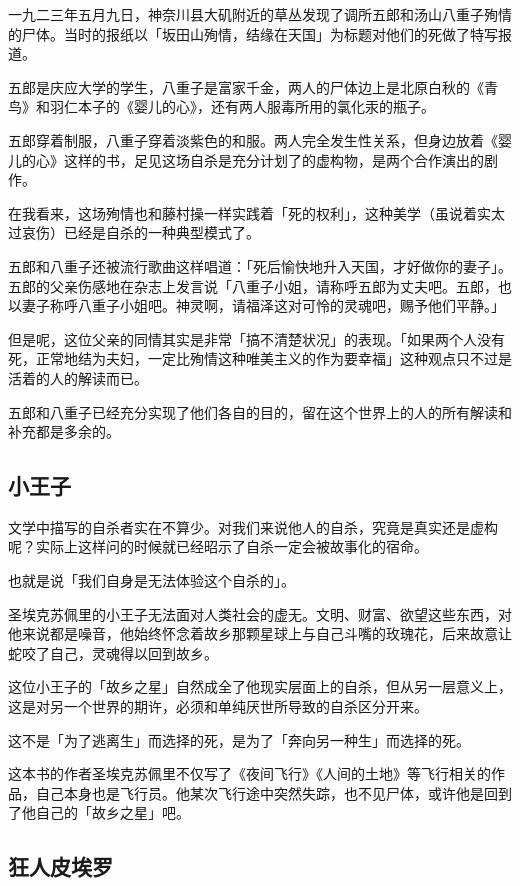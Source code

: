 \documentclass[UTF8]{ctexart}
\begin{document}
一九二三年五月九日，神奈川县大矶附近的草丛发现了调所五郎和汤山八重子殉情的尸体。当时的报纸以「坂田山殉情，结缘在天国」为标题对他们的死做了特写报道。

五郎是庆应大学的学生，八重子是富家千金，两人的尸体边上是北原白秋的《青鸟》和羽仁本子的《婴儿的心》，还有两人服毒所用的氯化汞的瓶子。

五郎穿着制服，八重子穿着淡紫色的和服。两人完全发生性关系，但身边放着《婴儿的心》这样的书，足见这场自杀是充分计划了的虚构物，是两个合作演出的剧作。

在我看来，这场殉情也和藤村操一样实践着「死的权利」，这种美学（虽说着实太过哀伤）已经是自杀的一种典型模式了。

五郎和八重子还被流行歌曲这样唱道：「死后愉快地升入天国，才好做你的妻子」。
五郎的父亲伤感地在杂志上发言说「八重子小姐，请称呼五郎为丈夫吧。五郎，也以妻子称呼八重子小姐吧。神灵啊，请福泽这对可怜的灵魂吧，赐予他们平静。」

但是呢，这位父亲的同情其实是非常「搞不清楚状况」的表现。「如果两个人没有死，正常地结为夫妇，一定比殉情这种唯美主义的作为要幸福」这种观点只不过是活着的人的解读而已。

五郎和八重子已经充分实现了他们各自的目的，留在这个世界上的人的所有解读和补充都是多余的。

\subsection{小王子}
文学中描写的自杀者实在不算少。对我们来说他人的自杀，究竟是真实还是虚构呢？实际上这样问的时候就已经昭示了自杀一定会被故事化的宿命。

也就是说「我们自身是无法体验这个自杀的」。

圣埃克苏佩里的小王子无法面对人类社会的虚无。文明、财富、欲望这些东西，对他来说都是噪音，他始终怀念着故乡那颗星球上与自己斗嘴的玫瑰花，后来故意让蛇咬了自己，灵魂得以回到故乡。

这位小王子的「故乡之星」自然成全了他现实层面上的自杀，但从另一层意义上，这是对另一个世界的期许，必须和单纯厌世所导致的自杀区分开来。

这不是「为了逃离生」而选择的死，是为了「奔向另一种生」而选择的死。

这本书的作者圣埃克苏佩里不仅写了《夜间飞行》《人间的土地》等飞行相关的作品，自己本身也是飞行员。他某次飞行途中突然失踪，也不见尸体，或许他是回到了他自己的「故乡之星」吧。

\subsection{狂人皮埃罗}
\end{document}
